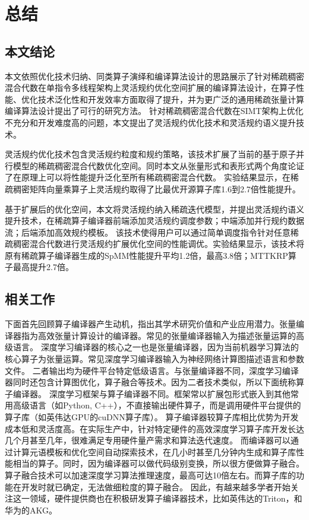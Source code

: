
\chapter{总结}
\section{本文结论}
本文依照优化技术归纳、同类算子演绎和编译算法设计的思路展示了针对稀疏稠密混合代数在单指令多线程架构上灵活规约优化空间扩展的编译算法设计，在算子性能、优化技术泛化性和开发效率方面取得了提升，并为更广泛的通用稀疏张量计算编译算法设计提出了可行的研究方法。
针对稀疏稠密混合代数在SIMT架构上优化不充分和开发难度高的问题，本文提出了灵活规约优化技术和灵活规约语义提升技术。

灵活规约优化技术包含灵活规约粒度和规约策略，该技术扩展了当前的基于原子并行模型的稀疏稠密混合代数优化空间。同时本文从张量形式和表形式两个角度论证了在原理上可以将性能提升泛化至所有稀疏稠密混合代数。
实验结果显示，在稀疏稠密矩阵向量乘算子上灵活规约取得了比最优开源算子库1.6到2.7倍性能提升。

基于扩展后的优化空间，本文将灵活规约纳入稀疏迭代模型，并提出灵活规约语义提升技术，在稀疏算子编译器前端添加灵活规约调度参数；中端添加并行规约数据流；后端添加高效规约模板。
该技术使得用户可以通过简单调度指令针对任意稀疏稠密混合代数进行灵活规约扩展优化空间的性能调优。实验结果显示，该技术将原有稀疏算子编译器生成的SpMM性能提升平均1.2倍，最高3.8倍；MTTKRP算子最高提升2.7倍。


\section{相关工作}
下面首先回顾算子编译器产生动机，指出其学术研究价值和产业应用潜力。张量编译器指为高效张量计算设计的编译器\cite{halide,kjolstad:2017:taco}。常见的张量编译器输入为描述张量运算的高级语言。
深度学习编译器\cite{tvm,rammer}的核心之一也是张量编译器，因为当前机器学习算法的核心算子为张量运算。常见深度学习编译器输入为神经网络计算图描述语言和参数文件。
二者输出均为硬件平台特定低级语言。与张量编译器不同，深度学习编译器同时还包含计算图优化，算子融合等技术。因为二者技术类似，所以下面统称算子编译器。
深度学习框架\cite{tensorflow,pytorch}与算子编译器不同。框架常以扩展包形式嵌入到其他常用高级语言（如Python, C++），不直接输出硬件算子，而是调用硬件平台提供的算子库（如英伟达GPU的cuDNN算子库\cite{cuDNN}）。
算子编译器较算子库相比优势为开发成本低和灵活度高。在实际生产中，针对特定硬件的高效深度学习算子库开发长达几个月甚至几年，很难满足专用硬件量产需求和算法迭代速度\cite{Heron}。
而编译器可以通过计算元语模板和优化空间自动探索技术，在几小时甚至几分钟内生成和算子库性能相当的算子\cite{Roller}。同时，因为编译器可以做代码级别变换，所以很方便做算子融合。
算子融合技术可以加速深度学习算法推理速度，最高可达10倍左右\cite{DNNFusion}。而算子库的功能在开发时就已确定，无法做细粒度的算子融合\cite{Graphene}。
因此，有越来越多学者开始关注这一领域\cite{PET,Tiramisu,Checkmate}，硬件提供商也在积极研发算子编译器技术，比如英伟达的Triton\cite{Triton}，和华为的AKG\cite{AKG}。

